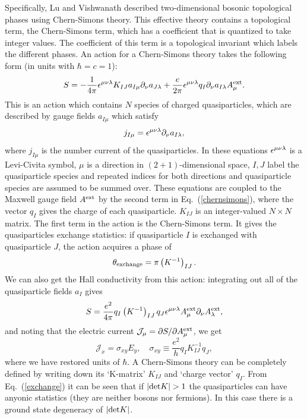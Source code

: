 Specifically, Lu and Vishwanath described two-dimensional bosonic topological phases using Chern-Simons theory. This effective theory contains a topological term, the Chern-Simons term, which has a coefficient that is quantized to take integer values. The coefficient of this term is a topological invariant which labels the different phases. An action for a Chern-Simons theory takes the following form (in units with $\hbar=c=1$)\cite{Wen_book}:
\begin{equation}
S=-\frac{1}{4\pi}\epsilon^{\mu\nu\lambda} K_{IJ}a_{I\mu}\partial_{\nu}a_{J\lambda} +\frac{e}{2\pi}\epsilon^{\mu\nu\lambda} q_I\partial_\nu a_{I\lambda}A^{\rm ext}_{\mu}.
\label{chernsimons}
\end{equation}
This is an action which contains $N$ species of charged quasiparticles, which are described by gauge fields $a_{I\mu}$ which satisfy 
\begin{equation}
j_{I\mu}=\epsilon^{\mu\nu\lambda} \partial_\nu a_{I\lambda},
\end{equation}
where $j_{I\mu}$ is the number current of the quasiparticles. In these equations $\epsilon^{\mu\nu\lambda}$ is a Levi-Civita symbol, $\mu$ is a direction in $(2+1)$-dimensional space, $I,J$ label the quasiparticle species and repeated indices for both directions and quasiparticle species are assumed to be summed over. These equations are coupled to the Maxwell gauge field $A^{\rm ext}$ by the second term in Eq.~(\ref{chernsimons}), where the vector $q_I$ gives the charge of each quasiparticle. $K_{IJ}$ is an integer-valued $N\times N$ matrix. The first term in the action is the Chern-Simons term. It gives the quasiparticles exchange statistics: if quasiparticle $I$ is exchanged with quasiparticle $J$, the action acquires a phase of 
\begin{equation}
\theta_{\rm exchange}=\pi \left(K^{-1}\right)_{IJ}.
\label{exchange}
\end{equation}
 We can also get the Hall conductivity from this action: integrating out all of the quasiparticle fields $a_I$ gives
\begin{equation}
S=\frac{e^2}{4\pi} q_I \left(K^{-1}\right)_{IJ} q_J \epsilon^{\mu\nu\lambda} A^{\rm ext}_\mu \partial_\nu A^{\rm ext}_\lambda,
\label{externalCS}
\end{equation}
and noting that the electric current $\mathcal{J}_\mu=\partial S/\partial A^{\rm ext}_\mu$, we get
\begin{equation}
\mathcal{J}_x=\sigma_{xy} E_y,\quad \sigma_{xy}\equiv \frac{e^2}{h}q_I K_{IJ}^{-1} q_J,
\end{equation}
where we have restored units of $\hbar$. A Chern-Simons theory can be completely defined by writing down its `K-matrix' $K_{IJ}$ and `charge vector' $q_I$. From Eq.~(\ref{exchange}) it can be seen that if $|{\rm det}K|>1$ the quasiparticles can have anyonic statistics (they are neither bosons nor fermions). In this case there is a ground state degeneracy of $|{\rm det}K|$. 

